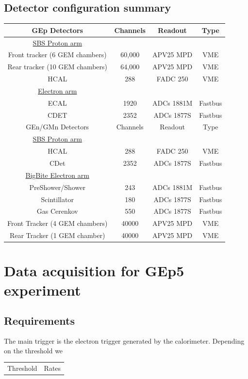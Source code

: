 \documentclass{article}
\begin{document}
\subsection{Detector configuration summary}
\begin{tabular}{|c|c|c|c|}
\hline
GEp Detectors & Channels& Readout & Type \\
\hline
\underline{SBS Proton arm} & & & \\
Front tracker (6 GEM chambers) & 60,000 & APV25 MPD& VME\\
Rear tracker (10 GEM chambers) & 64,000& APV25 MPD& VME\\
HCAL & 288 & FADC 250 &VME\\
\hline
\underline{Electron arm} & & & \\
ECAL & 1920 & ADCs 1881M&Fastbus\\
CDET & 2352 & ADCs 1877S &Fastbus \\
\hline
\hline
GEn/GMn Detectors & Channels& Readout & Type \\
\hline
\underline{SBS Proton arm} & & & \\
HCAL & 288 & FADC 250 &VME\\
CDet & 2352 & ADCs 1877S&Fastbus\\
\hline
\underline{BigBite Electron arm} & & & \\
PreShower/Shower & 243 & ADCs 1881M&Fastbus\\
Scintillator & 180& ADCs 1877S&Fastbus\\
Gas Cerenkov & 550& ADCs 1877S&Fastbus\\
Front Tracker (4 GEM chambers) & 40000& APV25 MPD &VME\\
Rear Tracker (1 GEM chamber) & 40000& APV25 MPD &VME\\
\hline
\end{tabular}




\section{Data acquisition for GEp5 experiment}
\subsection{Requirements}
The main trigger is the electron trigger generated by the calorimeter.
Depending on the threshold we 
\begin{tabular}{|c|c|}
Threshold & Rates\\
\end{tabular}
\end{document}
